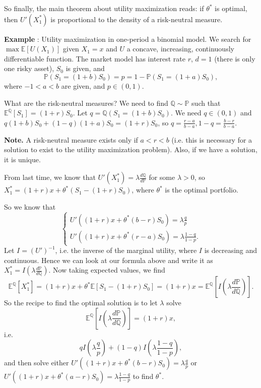 \documentclass{article}
\theoremstyle{definition}
\begin{document}
So finally, the main theorem about utility maximization reads: if $\theta^*$ is optimal, then $U'(X_1^*)$ is proportional to the density of a risk-neutral measure.

\vspace{1mm}

\textbf{Example} : Utility maximization in one-period a binomial model. We search for $\max \mathbb{E}[U(X_1)]$ given $X_1=x$ and $U$ a concave, increasing, continuously differentiable function. The market model has interest rate $r$, $d=1$ (there is only one risky asset), $S_0$ is given, and $$\mathbb{P}(S_1=(1+b)S_0) = p = 1- \mathbb{P}(S_1 = (1+a)S_0),$$
where $-1<a<b$ are given, and $p \in (0,1)$.

What are the risk-neutral measures? We need to find $\mathbb{Q} \sim \mathbb{P}$ such that $\mathbb{E}^{\mathbb{Q}}[S_1]=(1+r)S_0$. Let $q = \mathbb{Q}(S_1=(1+b)S_0)$. We need $q \in (0,1)$ and $q(1+b)S_0 + (1-q)(1+a)S_0 = (1+r)S_0$, so $q = \frac{r-a}{b-a}, 1-q = \frac{b-r}{b-a}$.
\vspace{1mm}

\textbf{Note.} A risk-neutral measure exists only if $a < r < b$ (i.e. this is necessary for a solution to exist to the utility maximization problem). Also, if we have a solution, it is unique.
\vspace{1mm}

From last time, we know that $U'(X_1^*) = \lambda \frac{d \mathbb{Q}}{d\mathbb{P}}$ for some $\lambda>0$, so $X_1^* = (1+r)x + \theta^*(S_1-(1+r)S_0)$, where $\theta^*$ is the optimal portfolio. 

So we know that
\[
\begin{cases}
    U'((1+r)x + \theta^*(b-r)S_0) = \lambda \frac{q}{p} \\
    U'((1+r)x + \theta^*(r-a)S_0) = \lambda \frac{1-q}{1-p}.
\end{cases}
\]
Let $I = (U')^{-1}$, i.e. the inverse of the marginal utility, where $I$ is decreasing and continuous. Hence we can look at our formula above and write it as $X_1^* = I(\lambda \frac{d \mathbb{P}}{d\mathbb{Q}})$. Now taking expected values, we find \[
\mathbb{E}^{\mathbb{Q}}[X_1^*] = (1+r)x + \theta^*\mathbb{E}[S_1-(1+r)S_0] = (1+r)x = \mathbb{E}^{\mathbb{Q}}\left[I\left(\lambda \frac{d \mathbb{P}}{d\mathbb{Q}}\right)\right].
\]
So the recipe to find the optimal solution is to let $\lambda$ solve $$\mathbb{E}^{\mathbb{Q}}\left[I \left(\lambda \frac{d \mathbb{P}}{d\mathbb{Q}}\right)\right] = (1+r)x,$$
i.e. $$q I\left(\lambda\frac{q}{p}\right) + (1-q)I\left(\lambda \frac{1-q}{1-p}\right),$$ and then solve either $U'((1+r)x + \theta^*(b-r)S_0) = \lambda \frac{q}{p}$ or $U'((1+r)x + \theta^*(a-r)S_0) = \lambda \frac{1-q}{1-p}$ to find $\theta^*$.
\vspace{1mm}
\end{document}
